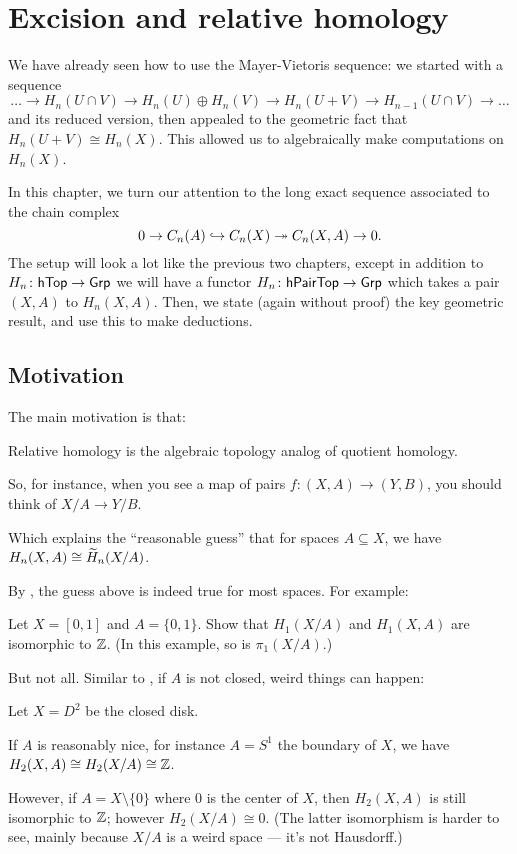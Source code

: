 \chapter{Excision and relative homology}
\label{ch:relative_hom}
We have already seen how to use the Mayer-Vietoris sequence:
we started with a sequence
\[ \dots \to H_n(U \cap V) \to H_n(U) \oplus H_n(V) \to H_n(U+V) \to H_{n-1}(U \cap V) \to \dots \]
and its reduced version,
then appealed to the geometric fact that $H_n(U+V) \cong H_n(X)$.
This allowed us to algebraically make computations on $H_n(X)$.

In this chapter, we turn our attention to the long exact
sequence associated to the chain complex
\[ 0 \to C_n(A) \hookrightarrow C_n(X) \twoheadrightarrow C_n(X,A) \to 0. \]
The setup will look a lot like the previous two chapters,
except in addition to $H_n \colon \mathsf{hTop} \to \mathsf{Grp}$
we will have a functor $H_n \colon \mathsf{hPairTop} \to \mathsf{Grp}$
which takes a pair $(X,A)$ to $H_n(X,A)$.
Then, we state (again without proof) the key geometric result,
and use this to make deductions.

\section{Motivation}

The main motivation is that:
\begin{moral}
	Relative homology is the algebraic topology analog of quotient homology.
\end{moral}
So, for instance, when you see a map of pairs
$f \colon (X, A) \to (Y, B)$, you should think of $X/A \to Y/B$.

Which explains the ``reasonable guess''
that for spaces $A \subseteq X$, we have $H_n(X,A) \cong \widetilde H_n(X/A)$.

By , the guess above is indeed true for most spaces. For example:
\begin{ques}
	Let $X = [0, 1]$ and $A = \{ 0, 1 \}$. Show that $H_1(X/A)$ and $H_1(X, A)$
	are isomorphic to $\mathbb Z$. (In this example, so is $\pi_1(X/A)$.)
\end{ques}

But not all. Similar to , if $A$ is not closed, weird
things can happen:
\begin{example}
	Let $X = D^2$ be the closed disk.

	If $A$ is reasonably nice, for instance $A = S^1$ the boundary of $X$, we have $H_2(X, A) \cong
	H_2(X/A) \cong \mathbb Z$.

	However, if $A = X \setminus \{ 0 \}$ where $0$ is the center of $X$, then
	$H_2(X, A)$ is still isomorphic to $\mathbb Z$; however $H_2(X/A) \cong 0$. (The latter
	isomorphism is harder to see, mainly because $X/A$ is a weird space --- it's not Hausdorff.)
\end{example}

